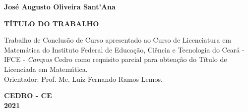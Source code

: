 \begin{titlepage}

\begin{center}
\textbf{José Augusto Oliveira Sant'Ana\\}
\vspace{7,5cm}

		\textbf{TÍTULO DO TRABALHO}\\

\vspace{2.5cm}

\vspace{2cm}
\begin{flushright}
	\begin{minipage}[l]{8cm}
		Trabalho de Conclusão de Curso apresentado ao Curso de Licenciatura em Matemática do Instituto Federal de Educação, Ciência e Tecnologia do Ceará -IFCE - {\it{Campus}} Cedro como requisito parcial para obtenção do Título de Licenciada em Matemática.\\
		Orientador: Prof. Me. Luiz Fernando Ramos Lemos.
	\end{minipage}
\end{flushright}

\end{center}

\vfill
\centering
		
			\textbf{CEDRO - CE \\2021}

\end{titlepage}




